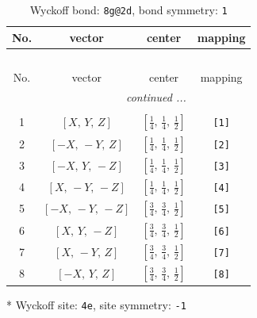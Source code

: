 \documentclass[fleqn,8pt]{jsarticle}
\begin{document}
\renewcommand{\arraystretch}{1.2}
\begin{longtable}{cccc}
\caption{Wyckoff bond: {\tt 8g@2d}, bond symmetry: {\tt 1}}
 \\
 \hline \hline
No. & vector & center & mapping \\ \hline \endfirsthead

\multicolumn{3}{l}{\tablename\ \thetable{}} \\
 \hline \hline
No. & vector & center & mapping \\ \hline \endhead

 \hline \hline
\multicolumn{3}{r}{\footnotesize\it continued ...} \\ \endfoot

 \hline \hline
\multicolumn{3}{r}{} \\ \endlastfoot

1 & $\left[ X,\, Y,\, Z \right]$ & $\left[ \frac{1}{4},\, \frac{1}{4},\, \frac{1}{2} \right]$ & {\tt [1]} \\ \hline
2 & $\left[ - X,\, - Y,\, Z \right]$ & $\left[ \frac{1}{4},\, \frac{1}{4},\, \frac{1}{2} \right]$ & {\tt [2]} \\ \hline
3 & $\left[ - X,\, Y,\, - Z \right]$ & $\left[ \frac{1}{4},\, \frac{1}{4},\, \frac{1}{2} \right]$ & {\tt [3]} \\ \hline
4 & $\left[ X,\, - Y,\, - Z \right]$ & $\left[ \frac{1}{4},\, \frac{1}{4},\, \frac{1}{2} \right]$ & {\tt [4]} \\ \hline
5 & $\left[ - X,\, - Y,\, - Z \right]$ & $\left[ \frac{3}{4},\, \frac{3}{4},\, \frac{1}{2} \right]$ & {\tt [5]} \\ \hline
6 & $\left[ X,\, Y,\, - Z \right]$ & $\left[ \frac{3}{4},\, \frac{3}{4},\, \frac{1}{2} \right]$ & {\tt [6]} \\ \hline
7 & $\left[ X,\, - Y,\, Z \right]$ & $\left[ \frac{3}{4},\, \frac{3}{4},\, \frac{1}{2} \right]$ & {\tt [7]} \\ \hline
8 & $\left[ - X,\, Y,\, Z \right]$ & $\left[ \frac{3}{4},\, \frac{3}{4},\, \frac{1}{2} \right]$ & {\tt [8]} \\
\end{longtable}
* Wyckoff site: {\tt 4e}, site symmetry: {\tt -1}
\renewcommand{\arraystretch}{1.2}
\end{document}
